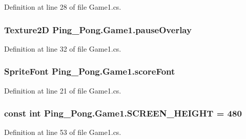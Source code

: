 Definition at line 28 of file Game1.\-cs.

\hypertarget{class_ping___pong_1_1_game1_a2ef093c4cac7c244c30664dacecc7aa2}{
\subsubsection[{pause\-Overlay}]{\setlength{\rightskip}{0pt plus 5cm}Texture2\-D Ping\-\_\-\-Pong.\-Game1.\-pause\-Overlay\hspace{0.3cm}{\ttfamily [private]}}}\label{class_ping___pong_1_1_game1_a2ef093c4cac7c244c30664dacecc7aa2}


Definition at line 32 of file Game1.\-cs.

\hypertarget{class_ping___pong_1_1_game1_adcc5e0fb3bc88b1ea3ae2c4c1a06a936}{
\subsubsection[{score\-Font}]{\setlength{\rightskip}{0pt plus 5cm}Sprite\-Font Ping\-\_\-\-Pong.\-Game1.\-score\-Font\hspace{0.3cm}{\ttfamily [private]}}}\label{class_ping___pong_1_1_game1_adcc5e0fb3bc88b1ea3ae2c4c1a06a936}


Definition at line 21 of file Game1.\-cs.

\hypertarget{class_ping___pong_1_1_game1_a6128f974e5abe6615565769664daba1c}{
\subsubsection[{S\-C\-R\-E\-E\-N\-\_\-\-H\-E\-I\-G\-H\-T}]{\setlength{\rightskip}{0pt plus 5cm}const int Ping\-\_\-\-Pong.\-Game1.\-S\-C\-R\-E\-E\-N\-\_\-\-H\-E\-I\-G\-H\-T = 480\hspace{0.3cm}{\ttfamily [private]}}}\label{class_ping___pong_1_1_game1_a6128f974e5abe6615565769664daba1c}


Definition at line 53 of file Game1.\-cs.

